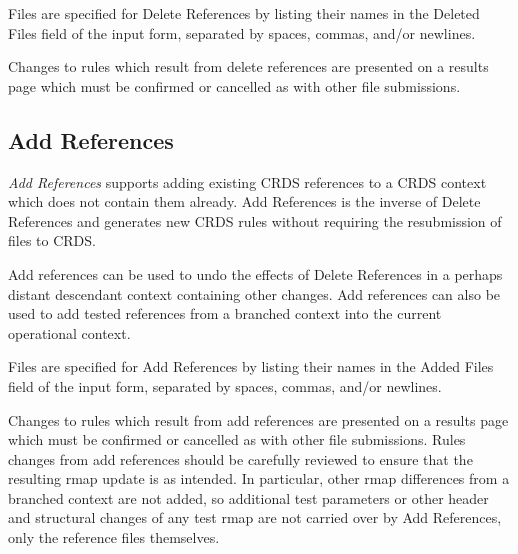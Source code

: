\documentclass[letterpaper,10pt,english]{sphinxmanual}
\begin{document}
Files are specified for Delete References by listing their names in the Deleted
Files field of the input form, separated by spaces, commas, and/or newlines.

Changes to rules which result from delete references are presented on a results
page which must be confirmed or cancelled as with other file submissions.


\subsection{Add References}
\label{web_site_use:add-references}
\emph{Add References} supports adding existing CRDS references to a CRDS context
which does not contain them already.  Add References is the inverse of Delete
References and generates new CRDS rules without requiring the resubmission of
files to CRDS.
\begin{figure}[htbp]
\centering

\end{figure}

Add references can be used to undo the effects of Delete References in a
perhaps distant descendant context containing other changes.  Add references
can also be used to add tested references from a branched context into the
current operational context.

Files are specified for Add References by listing their names in the Added
Files field of the input form, separated by spaces, commas, and/or newlines.

Changes to rules which result from add references are presented on a results
page which must be confirmed or cancelled as with other file submissions.
Rules changes from add references should be carefully reviewed to ensure that
the resulting rmap update is as intended.  In particular, other rmap
differences from a branched context are not added, so additional test
parameters or other header and structural changes of any test rmap are not
carried over by Add References,  only the reference files themselves.
\end{document}
